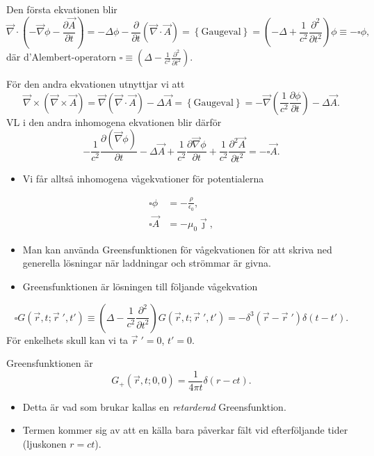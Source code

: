 \documentclass[%
oneside,                 %
final,                   %
10pt]{article}
\begin{document}
\noindent
Den första ekvationen blir
$$
\vec{\nabla} \cdot \left(-\vec{\nabla} \phi - \frac{\partial \vec{A}}{\partial t} \right) = -\Delta \phi - \frac{\partial}{\partial t} (\vec{\nabla} \cdot \vec{A}) = \left\{ \mathrm{Gaugeval} \right\} = \left( -\Delta + \frac{1}{c^2} \frac{\partial^2}{\partial t^2} \right) \phi \equiv - \square \phi,
$$
där d'Alembert-operatorn $\square \equiv \left( \Delta - \frac{1}{c^2} \frac{\partial^2}{\partial t^2} \right)$.

För den andra ekvationen utnyttjar vi att
$$
\vec{\nabla} \times \left( \vec{\nabla} \times \vec{A} \right) = \vec{\nabla} \left( \vec{\nabla} \cdot \vec{A} \right) - \Delta \vec{A} = \left\{ \mathrm{Gaugeval} \right\} = -\vec{\nabla} \left( \frac{1}{c^2} \frac{\partial \phi}{\partial t} \right) - \Delta \vec{A}.
$$
VL i den andra inhomogena ekvationen blir därför
$$ 
-\frac{1}{c^2} \frac{\partial (\vec{\nabla} \phi)}{\partial t} - \Delta \vec{A} + \frac{1}{c^2}
\frac{\partial \vec{\nabla} \phi}{\partial t} + \frac{1}{c^2} \frac{\partial^2 \vec{A}}{\partial  t^2} = -\square \vec{A}.
$$

\begin{itemize}
\item Vi får alltså inhomogena vågekvationer för potentialerna
\end{itemize}

\noindent
\begin{align*}
\square\phi&=-\frac{\rho}{\epsilon_0}, \\
\square\vec A&=-\mu_0\vec\jmath ,
\end{align*}
\begin{itemize}
\item Man kan använda Greensfunktionen för vågekvationen för att skriva ned generella lösningar när laddningar och strömmar är givna.

\item Greensfunktionen är lösningen till följande vågekvation
\end{itemize}

\noindent
$$
\square G(\vec{r},t;\vec{r}{\;}',t') \equiv (\Delta - \frac{1}{c^2} \frac{\partial^2}{\partial t^2}) G(\vec{r},t;\vec{r}{\;}',t') = -\delta^3(\vec{r}-\vec{r}{\;}')\delta(t-t').
$$
För enkelhets skull kan vi ta $\vec{r}{\;}'=0$, $t'=0$.

Greensfunktionen är
$$
G_+(\vec{r},t;0,0) = \frac{1}{4\pi t} \delta(r-ct).
$$  
\begin{itemize}
\item Detta är vad som brukar kallas en \emph{retarderad} Greensfunktion. 

\item Termen kommer sig av att en källa bara påverkar fält vid efterföljande tider (ljuskonen $r=ct$).
\end{itemize}
\end{document}
